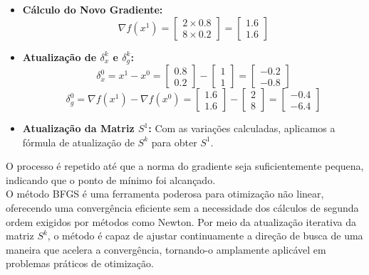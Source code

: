 \documentclass[a4paper, 12pt]{article}
\begin{document}
\begin{itemize}
    \item \textbf{Cálculo do Novo Gradiente:}
    \begin{equation}
    \nabla f(x^1) = \begin{bmatrix} 2 \times 0.8 \\ 8 \times 0.2 \end{bmatrix} = \begin{bmatrix} 1.6 \\ 1.6 \end{bmatrix}
    \end{equation}
    
    \item \textbf{Atualização de $\delta_x^k$ e $\delta_g^k$:}
    \begin{equation}
    \delta_x^0 = x^1 - x^0 = \begin{bmatrix} 0.8 \\ 0.2 \end{bmatrix} - \begin{bmatrix} 1 \\ 1 \end{bmatrix} = \begin{bmatrix} -0.2 \\ -0.8 \end{bmatrix}
    \end{equation}
    \begin{equation}
    \delta_g^0 = \nabla f(x^1) - \nabla f(x^0) = \begin{bmatrix} 1.6 \\ 1.6 \end{bmatrix} - \begin{bmatrix} 2 \\ 8 \end{bmatrix} = \begin{bmatrix} -0.4 \\ -6.4 \end{bmatrix}
    \end{equation}
    
    \item \textbf{Atualização da Matriz $S^1$:} Com as variações calculadas, aplicamos a fórmula de atualização de $S^k$ para obter $S^1$.
\end{itemize}

O processo é repetido até que a norma do gradiente seja suficientemente pequena, indicando que o ponto de mínimo foi alcançado.\\

O método BFGS é uma ferramenta poderosa para otimização não linear, oferecendo uma convergência eficiente sem a necessidade dos cálculos de segunda ordem exigidos por métodos como Newton. Por meio da atualização iterativa da matriz $S^k$, o método é capaz de ajustar continuamente a direção de busca de uma maneira que acelera a convergência, tornando-o amplamente aplicável em problemas práticos de otimização.
\end{document}
